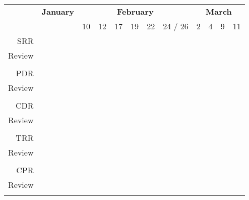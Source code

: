 \begin{tabular}{rlllllllllll}
\multicolumn{1}{c}{\textbf{}} &
\multicolumn{1}{c}{\cellcolor[HTML]{9AFF99}\textbf{January}} &
\multicolumn{6}{c}{\cellcolor[HTML]{FFCC67}\textbf{February}} &
\multicolumn{4}{c}{\cellcolor[HTML]{96FFFB}\textbf{March}} \\
& & 10 & 12 & 17 & 19 & 22 & 24 / 26 & 2 & 4 & 9 & 11 \\ \hline

SRR    & & \cellcolor[HTML]{FD6864} & & & & & & & & & \\
Review & & & \cellcolor[HTML]{9698ED} & & & & & & & & \\ \\
PDR    & & & & \cellcolor[HTML]{FD6864} & & & & & & & \\
Review & & & & & \cellcolor[HTML]{9698ED} & & & & & & \\ \\
CDR    & & & & & & \cellcolor[HTML]{FD6864} & & & & & \\
Review & & & & & & & \cellcolor[HTML]{9698ED} & & & & \\ \\
TRR    & & & & & & & & \cellcolor[HTML]{FD6864} & & & \\
Review & & & & & & & & & \cellcolor[HTML]{9698ED} & & \\ \\
CPR    & & & & & & & & & & \cellcolor[HTML]{FD6864} & \\
Review & & & & & & & & & & & \cellcolor[HTML]{9698ED}\\ \\


\end{tabular}
